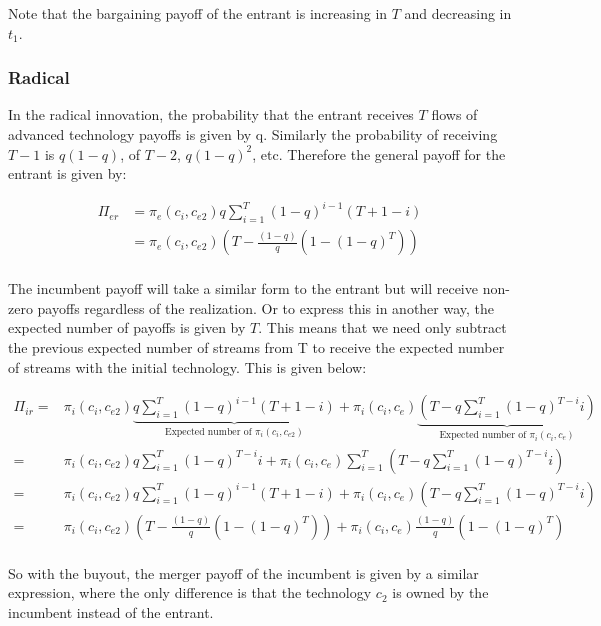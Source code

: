 Note that the bargaining payoff of the entrant is increasing in $T$ and decreasing in $t_1$. 

\subsubsection{Radical}

In the radical innovation, the probability that the entrant receives $T$ flows of advanced technology payoffs is given by q. Similarly the probability of receiving $T-1$ is $q(1-q)$, of $T-2$, $q(1-q)^2$, etc. Therefore the general payoff for the entrant is given by:

\begin{align*}
\Pi_{er} & = 
\pi_{e}(c_i,c_{e2}) q \sum_{i=1}^{T} (1-q)^{i-1} (T+1-i) \\
&= \pi_{e}(c_i,c_{e2}) \left( T - \frac{(1-q)}{q} \left( 1-(1-q)^T \right) \right) \\
\end{align*}

The incumbent payoff will take a similar form to the entrant but will receive non-zero payoffs regardless of the realization. Or to express this in another way, the expected number of payoffs is given by $T$. This means that we need only subtract the previous expected number of streams from T to receive the expected number of streams with the initial technology. This is given below: 

\begin{align*}
\Pi_{ir} =& \pi_{i}(c_i,c_{e2}) \underbrace{q \sum_{i=1}^{T} (1-q)^{i-1} (T+1-i)}_{\text{Expected number of } \pi_{i}(c_i,c_{e2})}+ \pi_i(c_i,c_e) \underbrace{ (T-q \sum_{i=1}^{T} (1-q)^{T-i} i)}_{\text{Expected number of } \pi_{i}(c_i,c_{e})}
\\
=& \pi_{i}(c_i,c_{e2}) q \sum_{i=1}^{T} (1-q)^{T-i} i + \pi_i(c_i,c_e)  \sum_{i=1}^T (T-q \sum_{i=1}^{T} (1-q)^{T-i} i)
\\ =& \pi_{i}(c_i,c_{e2})q \sum_{i=1}^{T} (1-q)^{i-1} (T+1-i)+ \pi_i(c_i,c_e) (T-q \sum_{i=1}^{T} (1-q)^{T-i} i)
\\ =&\pi_{i}(c_i,c_{e2}) \left( T - \frac{(1-q)}{q} \left( 1-(1-q)^T \right) \right)
+\pi_i(c_i,c_e) \frac{(1-q)}{q} \left( 1-(1-q)^T \right) \\
\end{align*}

So with the buyout, the merger payoff of the incumbent is given by a similar expression, where the only difference is that the technology $c_2$ is owned by the incumbent instead of the entrant. 


